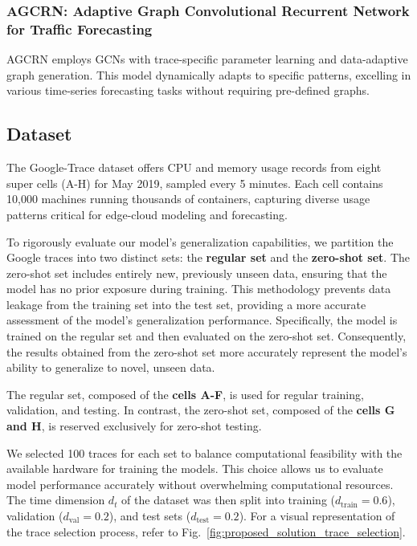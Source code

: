 \documentclass{ieeetmlcn}
\begin{document}
\subsubsection*{\textbf{AGCRN: Adaptive Graph Convolutional Recurrent Network for Traffic Forecasting \cite{AGCRN}}}
AGCRN employs GCNs with trace-specific parameter learning and data-adaptive graph generation. This model dynamically adapts to specific patterns, excelling in various time-series forecasting tasks without requiring pre-defined graphs.


\subsection{Dataset}
\label{sec:Dataset}

The Google-Trace dataset \cite{google2019cluster} offers CPU and memory usage records from eight super cells (A-H) for May 2019, sampled every 5 minutes. Each cell contains 10,000 machines running thousands of containers, capturing diverse usage patterns critical for edge-cloud modeling and forecasting.

To rigorously evaluate our model's generalization capabilities, we partition the Google traces into two distinct sets: the \textbf{regular set} and the \textbf{zero-shot set}. The zero-shot set includes entirely new, previously unseen data, ensuring that the model has no prior exposure during training. This methodology prevents data leakage from the training set into the test set, providing a more accurate assessment of the model's generalization performance. Specifically, the model is trained on the regular set and then evaluated on the zero-shot set. Consequently, the results obtained from the zero-shot set more accurately represent the model's ability to generalize to novel, unseen data.

The regular set, composed of the \textbf{cells A-F}, is used for regular training, validation, and testing. In contrast, the zero-shot set, composed of the \textbf{cells G and H}, is reserved exclusively for zero-shot testing.

We selected 100 traces for each set to balance computational feasibility with the available hardware for training the models. This choice allows us to evaluate model performance accurately without overwhelming computational resources. The time dimension $d_t$ of the dataset was then split into training ($d_\text{train} = 0.6$), validation ($d_\text{val} = 0.2$), and test sets ($d_\text{test} = 0.2$). For a visual representation of the trace selection process, refer to Fig.~\ref{fig:proposed_solution_trace_selection}.
\end{document}

